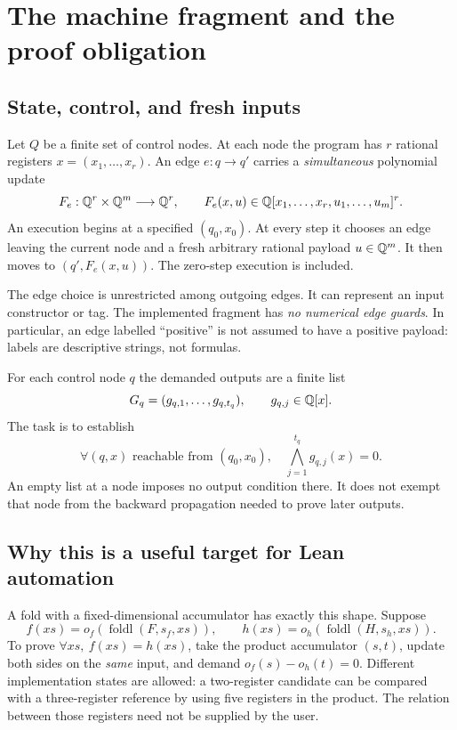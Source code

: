 \section{The machine fragment and the proof obligation}
\label{sec:model}

\subsection{State, control, and fresh inputs}
Let $Q$ be a finite set of control nodes. At each node the program has $r$
rational registers $x=(x_1,\ldots,x_r)$. An edge $e:q\to q'$ carries a
\emph{simultaneous} polynomial update
\[
 F_e:\mathbb Q^r\times\mathbb Q^m\longrightarrow\mathbb Q^r,
 \qquad F_e(x,u)\in\mathbb Q[x_1,\ldots,x_r,u_1,\ldots,u_m]^r.
\]
An execution begins at a specified $(q_0,x_0)$. At every step it chooses an edge
leaving the current node and a fresh arbitrary rational payload $u\in\mathbb Q^m$.
It then moves to $(q',F_e(x,u))$. The zero-step execution is included.

The edge choice is unrestricted among outgoing edges. It can represent an
input constructor or tag. The implemented fragment has \emph{no numerical
edge guards}. In particular, an edge labelled ``positive'' is not assumed to
have a positive payload: labels are descriptive strings, not formulas.

For each control node $q$ the demanded outputs are a finite list
\[
 G_q=(g_{q,1},\ldots,g_{q,t_q}),\qquad g_{q,j}\in\mathbb Q[x].
\]
The task is to establish
\begin{equation}\label{eq:task}
 \forall(q,x)\text{ reachable from }(q_0,x_0),\quad
 \bigwedge_{j=1}^{t_q}g_{q,j}(x)=0.
\end{equation}
An empty list at a node imposes no output condition there. It does not exempt
that node from the backward propagation needed to prove later outputs.

\subsection{Why this is a useful target for Lean automation}
A fold with a fixed-dimensional accumulator has exactly this shape. Suppose
\[
 f(xs)=o_f(\operatorname{foldl}(F,s_f,xs)),\qquad
 h(xs)=o_h(\operatorname{foldl}(H,s_h,xs)).
\]
To prove $\forall xs,\ f(xs)=h(xs)$, take the product accumulator $(s,t)$,
update both sides on the \emph{same} input, and demand
$o_f(s)-o_h(t)=0$. Different implementation states are allowed: a two-register
candidate can be compared with a three-register reference by using five
registers in the product. The relation between those registers need not be
supplied by the user.

